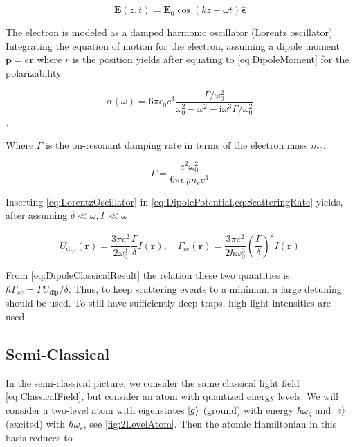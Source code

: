 \begin{equation}\label{eq:ClassicalField}
	\mathbf{E}(z,t) = \mathbf{E}_0 \cos{(k z - \omega t)} 	\bm{\hat{\epsilon}}
\end{equation}
	 
The electron is modeled as a damped harmonic oscillator (Lorentz oscillator). Integrating the equation of motion for the electron, assuming a dipole moment $\mathbf{p} = e \mathbf{r}$ where $r$ is the position yields after equating to \cref{eq:DipoleMoment} for the polarizability \cite{Grimm2000}

\begin{equation}\label{eq:LorentzOscillator}
	\alpha(\omega)=6 \pi \epsilon_{0} c^{3} \frac{\Gamma / \omega_{0}^{2}}{\omega_{0}^{2}-\omega^{2}-\mathrm{i}\omega^3\Gamma/\omega_0^2}
\end{equation},

Where $\Gamma$ is the on-resonant damping rate in terms of the electron mass $m_e$. 

\begin{equation}\label{eq:ResonantDampingRate}
	\Gamma = \frac{e^2 \omega_0^2}{6\pi \epsilon_0 m_e c^3}
\end{equation}

Inserting \cref{eq:LorentzOscillator} in \cref{eq:DipolePotential,eq:ScatteringRate} yields, after assuming $\delta \ll \omega, \Gamma \ll \omega$

\begin{equation}\label{eq:DipoleClassicalResult} 
	U_{\text{dip}}(\mathbf{r}) = 
	\frac{3\pi c^2}{2\omega_0^3}\frac{\Gamma}{\delta} I(\mathbf{r}),
	\quad
	\Gamma_{\text{sc}}(\mathbf{r}) = 
	\frac{3\pi c^2}{2\hbar\omega_0^3}\left(\frac{\Gamma}{\delta}\right)^2 I(\mathbf{r})
\end{equation}

From \cref{eq:DipoleClassicalResult} the relation these two quantities is $\hbar \Gamma_{sc} =\Gamma U_{\text{dip}}/\delta$. 
Thus, to keep scattering events to a minimum a large detuning should be used.
To still have sufficiently deep traps, high light intensities are used. 


\subsection{Semi-Classical}

In the semi-classical picture, we consider the same classical light field \cref{eq:ClassicalField}, but consider an atom with quantized energy levels. 
We will consider a two-level atom with eigenstates $\lvert g\rangle$ (ground) with energy $\hbar \omega_g$ and $\lvert e\rangle$ (excited) with $\hbar \omega_e$, see \cref{fig:2LevelAtom}. 
Then the atomic Hamiltonian in this basis reduces to \cite{Loudon2000}

